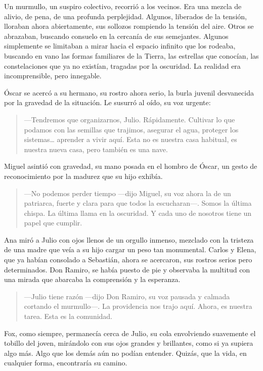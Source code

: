 \documentclass[a4paper,12pt]{book}
\begin{document}
Un murmullo, un suspiro colectivo, recorrió a los vecinos. Era una mezcla de alivio, de pena, de una profunda perplejidad. Algunos, liberados de la tensión, lloraban ahora abiertamente, sus sollozos rompiendo la tensión del aire. Otros se abrazaban, buscando consuelo en la cercanía de sus semejantes. Algunos simplemente se limitaban a mirar hacia el espacio infinito que los rodeaba, buscando en vano las formas familiares de la Tierra, las estrellas que conocían, las constelaciones que ya no existían, tragadas por la oscuridad. La realidad era incomprensible, pero innegable.

Óscar se acercó a su hermano, su rostro ahora serio, la burla juvenil desvanecida por la gravedad de la situación. Le susurró al oído, su voz urgente:

\begin{quote}
    —Tendremos que organizarnos, Julio. Rápidamente. Cultivar lo que podamos con las semillas que trajimos, asegurar el agua, proteger los sistemas… aprender a vivir aquí. Esta no es nuestra casa habitual, es nuestra nueva casa, pero también es una nave.
\end{quote}

Miguel asintió con gravedad, su mano posada en el hombro de Óscar, un gesto de reconocimiento por la madurez que su hijo exhibía.

\begin{quote}
    —No podemos perder tiempo —dijo Miguel, su voz ahora la de un patriarca, fuerte y clara para que todos la escucharan—. Somos la última chispa. La última llama en la oscuridad. Y cada uno de nosotros tiene un papel que cumplir.
\end{quote}

Ana miró a Julio con ojos llenos de un orgullo inmenso, mezclado con la tristeza de una madre que veía a su hijo cargar un peso tan monumental. Carlos y Elena, que ya habían consolado a Sebastián, ahora se acercaron, sus rostros serios pero determinados. Don Ramiro, se había puesto de pie y observaba la multitud con una mirada que abarcaba la comprensión y la esperanza.

\begin{quote}
    —Julio tiene razón —dijo Don Ramiro, su voz pausada y calmada cortando el murmullo—. La providencia nos trajo aquí. Ahora, es nuestra tarea. Esta es la comunidad.
\end{quote}

Fox, como siempre, permanecía cerca de Julio, su cola envolviendo suavemente el tobillo del joven, mirándolo con sus ojos grandes y brillantes, como si ya supiera algo más. Algo que los demás aún no podían entender. Quizás, que la vida, en cualquier forma, encontraría su camino.
\end{document}
